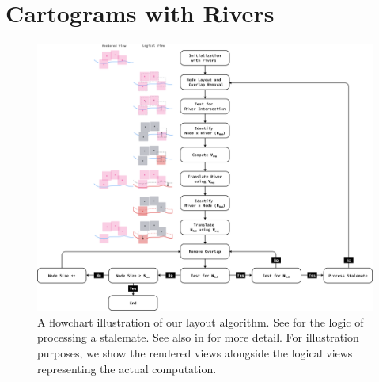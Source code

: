 \section{Cartograms with Rivers}
 {
  \begin{figure}[tb!]
      \centering
      \includegraphics[width=\textwidth,height=\textheight,keepaspectratio]{figure/flowchart.png}
      \caption{A flowchart illustration of our layout algorithm. See  for the logic of processing a stalemate. See also  in  for more detail. For illustration purposes, we show the rendered views alongside the logical views representing the actual computation. }
      \label{fig:flowchart}
  \end{figure}
 }

